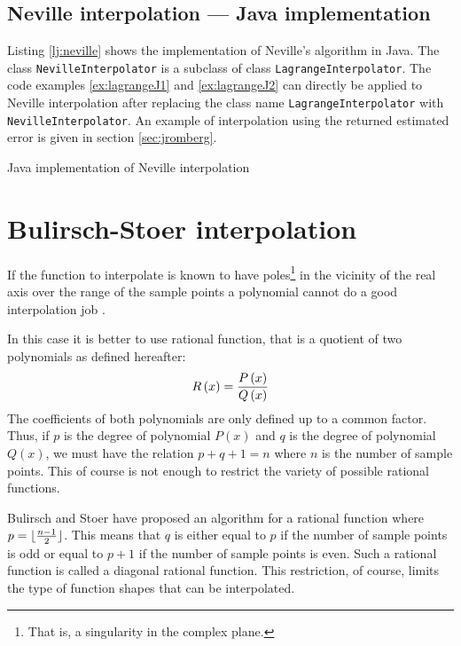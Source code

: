\documentclass[twoside]{book}
\begin{document}
\subsection{Neville interpolation --- Java implementation}
Listing \ref{lj:neville} shows the implementation of Neville's
algorithm in Java. The class {\tt NevilleInterpolator} is a
subclass of class {\tt LagrangeInterpolator}. The code examples
\ref{ex:lagrangeJ1} and \ref{ex:lagrangeJ2} can directly be
applied to Neville interpolation after replacing the class name
{\tt LagrangeInterpolator} with {\tt NevilleInterpolator}. An
example of interpolation using the returned estimated error is
given in section \ref{sec:jromberg}.


\begin{listing}Java implementation of Neville interpolation
\label{lj:neville}

\end{listing}

\section{Bulirsch-Stoer interpolation}
If the function to interpolate is known to have
poles\footnote{That is, a singularity in the complex plane.} in
the vicinity of the real axis over the range of the sample points
a polynomial cannot do a good interpolation job \cite{Press}.

In this case it is better to use rational function, that is a
quotient of two polynomials as defined hereafter:
\begin{equation}
R\left(x\right)={P\left(x\right)\over Q\left(x\right)}
\end{equation}
The coefficients of both polynomials are only defined up to a
common factor. Thus, if $p$ is the degree of polynomial
$P\left(x\right)$ and $q$ is the degree of polynomial
$Q\left(x\right)$, we must have the relation $p+q+1 = n$ where $n$
is the number of sample points. This of course is not enough to
restrict the variety of possible rational functions.

Bulirsch and Stoer have proposed an algorithm for a rational
function where $p=\lfloor{n-1 \over 2}\rfloor$. This means that
$q$ is either equal to $p$ if the number of sample points is odd
or equal to $p+1$ if the number of sample points is even. Such a
rational function is called a diagonal rational function. This
restriction, of course, limits the type of function shapes that
can be interpolated.
\end{document}
